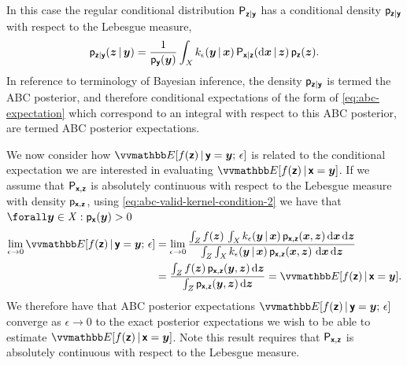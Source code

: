 In this case the regular conditional distribution $\mathsf{P}_{\boldsymbol{\mathsf{z}}|\boldsymbol{\mathsf{y}}}$ has a conditional density $\mathsf{p}_{\boldsymbol{\mathsf{z}}|\boldsymbol{\mathsf{y}}}$ with respect to the Lebesgue measure,
\begin{equation}\label{eq:abc-posterior-density}
  \mathsf{p}_{\boldsymbol{\mathsf{z}}|\boldsymbol{\mathsf{y}}}(\boldsymbol{z}\operatorname{|}\boldsymbol{y}) = 
  \frac{1}{\mathsf{p}_{\boldsymbol{\mathsf{y}}}(\boldsymbol{y})}
  \int_{\mathit{X}} k_{\epsilon}(\boldsymbol{y}\operatorname{|}\boldsymbol{x}) \,\mathsf{P}_{\boldsymbol{\mathsf{x}}|\boldsymbol{\mathsf{z}}}(\mathrm{d}\boldsymbol{x}\operatorname{|}\boldsymbol{z}) \,\mathsf{p}_{\boldsymbol{\mathsf{z}}}(\boldsymbol{z}).
\end{equation}
In reference to terminology of Bayesian inference, the density $\mathsf{p}_{\boldsymbol{\mathsf{z}}|\boldsymbol{\mathsf{y}}}$ is termed the \ac{ABC} posterior, and therefore conditional expectations of the form of \eqref{eq:abc-expectation} which correspond to an integral with respect to this \ac{ABC} posterior, are termed \ac{ABC} posterior expectations.


We now consider how $\expc{f(\rvct{z}) \gvn \rvct{y} = \vct{y};\,\epsilon}$ is related to the conditional expectation we are interested in evaluating $\expc{f(\rvct{z}) \gvn \rvct{x}=\vct{y}}$. If we assume that $\mathsf{P}_{\boldsymbol{\mathsf{x}},\boldsymbol{\mathsf{z}}}$ is absolutely continuous with respect to the Lebesgue measure with density $\mathsf{p}_{\boldsymbol{\mathsf{x}},\boldsymbol{\mathsf{z}}}$, using \eqref{eq:abc-valid-kernel-condition-2} we have that $\forall \vct{y} \in \set{X} : \pden{\rvct{x}}(\vct{y}) > 0$
\begin{equation*}\label{eq:abc-expectation-limit}
\begin{split}
  \lim_{\epsilon \to 0}
  \expc{f(\rvct{z}) \gvn \rvct{y} = \vct{y};\,\epsilon}
  &=
  \lim_{\epsilon \to 0}
  \frac{
  \int_{\set{Z}} f(\vct{z})\, \int_{\set{X}}
    k_{\epsilon}(\vct{y}\gvn\vct{x})\,
    \pden{\rvct{x},\rvct{z}}(\vct{x},\vct{z})
  \,\dr\vct{x}\,\dr\vct{z}
  }
  {
   \int_{\set{Z}}\int_{\set{X}}
    k_\epsilon(\vct{y}\gvn\vct{x})\,\pden{\rvct{x},\rvct{z}}(\vct{x},\vct{z})\,
  \,\dr\vct{x}\,\dr\vct{z}
  }\\
  & =
  \frac{
  \int_{\set{Z}}
    f(\vct{z})\,\pden{\rvct{x},\rvct{z}}(\vct{y},\vct{z})
  \,\dr\vct{z}}
  {\int_{\set{Z}}\pden{\rvct{x},\rvct{z}}(\vct{y},\vct{z})\,\dr\vct{z}}
  =
  \expc{f(\rvct{z}) \gvn \rvct{x} = \vct{y}}.
\end{split}
\end{equation*}
We therefore have that \ac{ABC} posterior expectations $\expc{f(\rvct{z}) \gvn \rvct{y}=\vct{y};\,\epsilon}$ converge as $\epsilon \to 0$ to the exact posterior expectations we wish to be able to estimate $\expc{f(\rvct{z}) \gvn \rvct{x}=\vct{y}}$. Note this result requires that $\mathsf{P}_{\boldsymbol{\mathsf{x}},\boldsymbol{\mathsf{z}}}$ is absolutely continuous with respect to the Lebesgue measure.%

